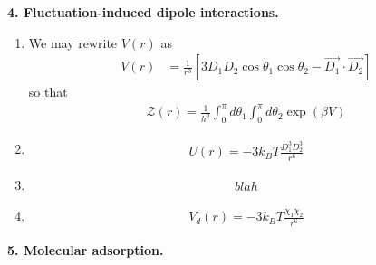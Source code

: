 \documentclass{article}
\theoremstyle{definition}
\newcommand{\be}{\beta}
\newcommand{\f}[2]{\frac{#1}{#2}}
\newcommand{\lb}{\left[}
\newcommand{\rb}{\right]}
\begin{document}
\noindent \textbf{4. Fluctuation-induced dipole interactions.}

\begin{enumerate}[label=(\alph*)]
	\item We may rewrite $V(r)$ as 
	\begin{align*}
	V(r) 
	&= \f{1}{r^3} \lb 3D_1 D_2 \cos\theta_1 \cos\theta_2  - \vec{D_1} \cdot \vec{D_2} \rb
 	\end{align*}
 	so that
	\begin{align*}
	\mathcal{Z}(r) = \f{1}{h^2}\int_0^\pi d\theta_1 \int_0^\pi d\theta_2 \exp(\be V) 
	\end{align*}
	
	\item 
	\begin{align*}
	U(r) = -3k_BT \f{D_1^3D_2^3}{r^6}
	\end{align*}
	
	\item 
	\begin{align*}
	blah
	\end{align*}
	
	\item 
	\begin{align*}
	V_d(r) = -3k_BT \f{\chi_1\chi_2 }{r^6}
	\end{align*}
\end{enumerate}



\noindent \textbf{5. Molecular adsorption.}
\end{document}

